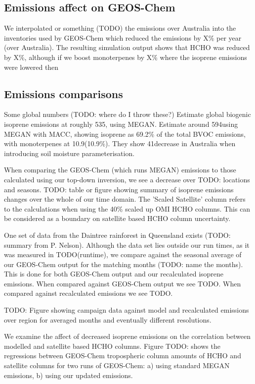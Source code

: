   \subsection{Emissions affect on GEOS-Chem}
    We interpolated or something (TODO) the emissions over Australia into the inventories used by GEOS-Chem which reduced the emissions by X\% per year (over Australia).
    The resulting simulation output shows that HCHO was reduced by X\%, although if we boost monoterpenes by X\% where the isoprene emissions were lowered then 
  
  \subsection{Emissions comparisons}
    
    Some global numbers (TODO: where do I throw these?)
    \citet{Guenther2012} Estimate global biogenic isoprene emissions at roughly 535\tgpyr, using MEGAN.
    \citet{Sindelarova2014} Estimate around 594\tgpyr using MEGAN with MACC, showing isoprene as 69.2\% of the total BVOC emissions, with monoterpenes at 10.9\tgpyr (10.9\%).
    They show 41\tgpyr decrease in Australia when introducing soil moisture parameterisation.
    
    When comparing the GEOS-Chem (which runs MEGAN) emissions to those calculated using our top-down inversion, we see a decrease over TODO: locations and seasons.
    TODO: table or figure showing summary of isoprene emissions changes over the whole of our time domain.
    The 'Scaled Satellite' column refers to the calculations when using the 40\% scaled up OMI HCHO columns. %
    This can be considered as a boundary on satellite based HCHO column uncertainty.
    
    One set of data from the Daintree rainforest in Queensland exists (TODO: summary from P. Nelson).
    Although the data set lies outside our run times, as it was measured in TODO(runtime), we compare against the seasonal average of our GEOS-Chem output for the matching months (TODO: name the months).
    This is done for both GEOS-Chem output and our recalculated isoprene emissions.
    When compared against GEOS-Chem output we see TODO.
    When compared against recalculated emissions we see TODO.
    
    TODO: Figure showing campaign data against model and recalculated emissions over region for averaged months and eventually different resolutions.
    
    We examine the affect of decreased isoprene emissions on the correlation between modelled and satellite based HCHO columns.
    Figure TODO: shows the regressions between GEOS-Chem tropospheric column amounts of HCHO and satellite columns for two runs of GEOS-Chem: a) using standard MEGAN emissions, b) using our updated emissions.
    
